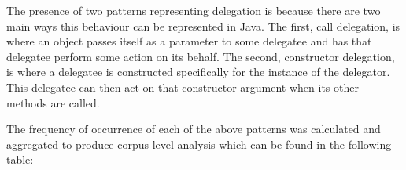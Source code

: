 The presence of two patterns representing delegation is because there are two main ways this behaviour can be represented in Java. The first, call delegation, is where an object passes itself as a parameter to some delegatee and has that delegatee perform some action on its behalf. The second, constructor delegation, is where a delegatee is constructed specifically for the instance of the delegator. This delegatee can then act on that constructor argument when its other methods are called.
\newline\newline\newline

The frequency of occurrence of each of the above patterns was calculated and aggregated to produce corpus level analysis which can be found in the following table:

